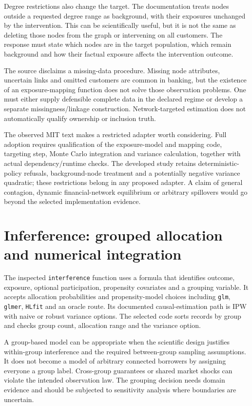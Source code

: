 Degree restrictions also change the target. The documentation treats nodes
outside a requested degree range as background, with their exposures unchanged
by the intervention. This can be scientifically useful, but it is not the
same as deleting those nodes from the graph or intervening on all customers.
The response must state which nodes are in the target population, which remain
background and how their factual exposure affects the intervention outcome.

The source disclaims a missing-data procedure. Missing node attributes,
uncertain links and omitted customers are common in banking, but the existence
of an exposure-mapping function does not solve those observation problems.
One must either supply defensible complete data in the declared regime or
develop a separate missingness/linkage construction. Network-targeted estimation
does not automatically qualify ownership or inclusion truth.

The observed MIT text makes a restricted adapter worth considering. Full adoption
requires qualification of the exposure-model and mapping code, targeting step,
Monte Carlo integration and variance calculation, together with actual
dependency/runtime checks. The developed study retains deterministic-policy
refusals, background-node treatment and a potentially negative variance
quadratic; these restrictions belong in any proposed adapter. A claim of general contagion, dynamic financial-network equilibrium or
arbitrary spillovers would go beyond the selected implementation evidence.

\section{Inferference: grouped allocation and numerical integration}

The inspected \texttt{interference} function uses a formula that identifies
outcome, exposure, optional participation, propensity covariates and a grouping
variable. It accepts allocation probabilities and propensity-model choices
including \texttt{glm}, \texttt{glmer}, \texttt{HLfit} and an oracle route.
Its documented causal-estimation path is IPW with naive or robust variance
options. The selected code sorts records by group and checks group count,
allocation range and the variance option. \citep{v13_sw_inferference}

A group-based model can be appropriate when the scientific design justifies
within-group interference and the required between-group sampling assumptions.
It does not become a model of arbitrary connected borrowers by assigning
everyone a group label. Cross-group guarantees or shared market shocks can
violate the intended observation law. The grouping decision needs domain
evidence and should be subjected to sensitivity analysis where boundaries
are uncertain.

